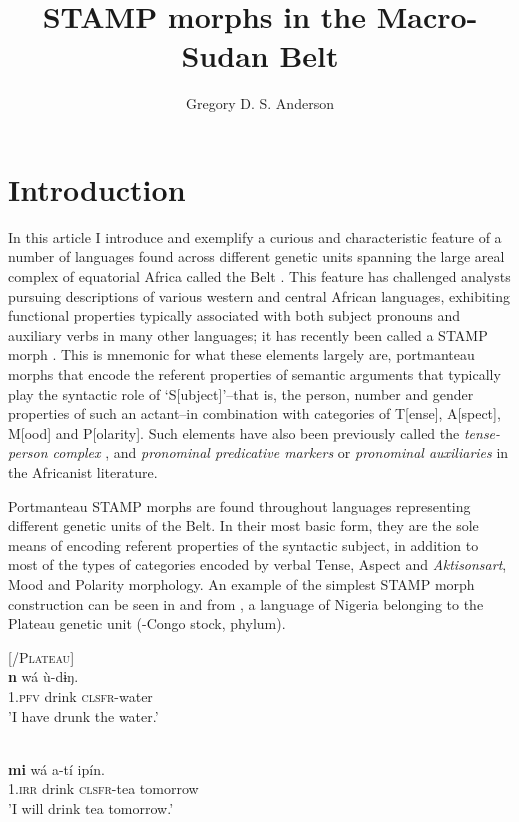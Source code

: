 \documentclass[output=paper]{langsci/langscibook}
\title{STAMP morphs in the Macro-Sudan Belt}
\author{%
Gregory D. S. Anderson
\affiliation{Living Tongues Institute for Endangered Languages
\newline
\& University of South Africa (UNISA)} 
}
\begin{document}
\section{Introduction}\label{sec:Anderson:1}

In this article I introduce and exemplify a curious and characteristic feature of a number of languages found across different genetic units spanning the large areal complex of equatorial Africa called the  Belt \citep{Güldemann2008}. This feature has challenged analysts pursuing descriptions of various western and central African languages, exhibiting functional properties typically associated with both subject pronouns and auxiliary verbs in many other languages; it has recently been called a STAMP morph \citep{Anderson2012, Anderson2015}. This is mnemonic for what these elements largely are, portmanteau morphs that encode the referent properties of semantic arguments that typically play the syntactic role of `S[ubject]'–that is, the person, number and gender properties of such an actant–in combination with categories of T[ense], A[spect], M[ood] and P[olarity]. Such elements have also been previously called the \textit{tense-person complex} \citep{Creissels2005}, and \textit{pronominal predicative markers} or \textit{pronominal auxiliaries} \citep{Vydrine2011,Erman2002} in the Africanist literature. 

  Portmanteau STAMP morphs are found throughout languages representing different genetic units of the  Belt. In their most basic form, they are the sole means of encoding referent properties of the syntactic subject, in addition to most of the types of categories encoded by verbal Tense, Aspect and \textit{Aktisonsart}, Mood and Polarity morphology. An example of the simplest STAMP morph construction can be seen in  and  from , a language of Nigeria belonging to the  Plateau genetic unit (-Congo stock,  phylum).
  
\ea\label{ex:anderson:1}
 \citep[238]{Sibomana1981}        [\textsc{/Plateau}]\\
\gll \textbf{n}        wá     ù-dɨŋ.    \\
\textsc{1.pfv}  drink \textsc{clsfr}-water\\
\glt 'I have drunk the water.'      
\z

\ea\label{ex:anderson:2}
   \\
\gll \textbf{mi}    wá  a-tí      ipín.  \\
1\textsc{.irr}  drink  \textsc{clsfr}-tea tomorrow \\
\glt 'I will drink tea tomorrow.'
\z
\end{document}

